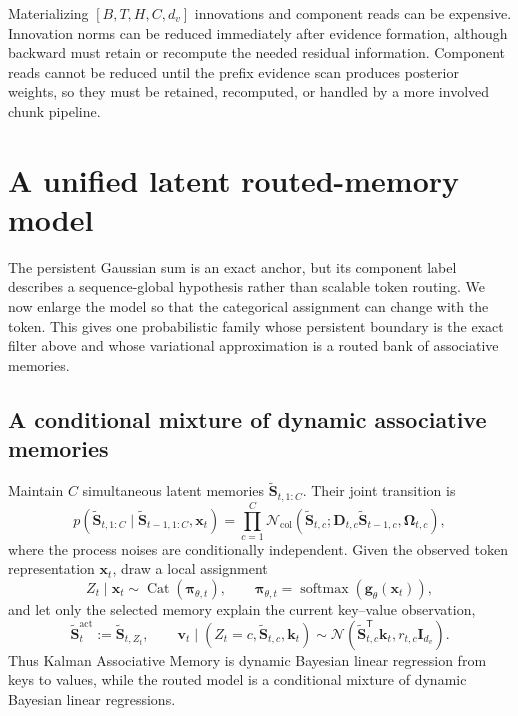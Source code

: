 \documentclass[11pt]{article}
\newcommand{\ve}[1]{\boldsymbol{#1}}
\newcommand{\tr}{\mathsf{T}}
\newcommand{\Normal}{\mathcal{N}}
\newcommand{\Cat}{\operatorname{Cat}}
\newcommand{\softmax}{\operatorname{softmax}}
\begin{document}
Materializing $[B,T,H,C,d_v]$ innovations and component reads can be expensive.  Innovation norms
can be reduced immediately after evidence formation, although backward must retain or recompute
the needed residual information.  Component reads cannot be reduced until the prefix evidence
scan produces posterior weights, so they must be retained, recomputed, or handled by a more
involved chunk pipeline.

\section{A unified latent routed-memory model}
\label{sec:kdn3-routing-boundary}

The persistent Gaussian sum is an exact anchor, but its component label describes a
sequence-global hypothesis rather than scalable token routing.  We now enlarge the model so that
the categorical assignment can change with the token.  This gives one probabilistic family whose
persistent boundary is the exact filter above and whose variational approximation is a routed bank
of associative memories.

\subsection{A conditional mixture of dynamic associative memories}
\label{sec:kdn3-routed-generative}

Maintain $C$ simultaneous latent memories
$\widetilde{\ve{S}}_{t,1:C}$.  Their joint transition is
\begin{equation}
  p(\widetilde{\ve{S}}_{t,1:C}
    \mid\widetilde{\ve{S}}_{t-1,1:C},\ve{x}_t)
  =\prod_{c=1}^{C}
   \Normal_{\mathrm{col}}\!\left(
     \widetilde{\ve{S}}_{t,c};
     \ve{D}_{t,c}\widetilde{\ve{S}}_{t-1,c},
     \ve{\Omega}_{t,c}
   \right),
  \label{eq:kdn3-joint-bank-transition}
\end{equation}
where the process noises are conditionally independent.  Given the observed token representation
$\ve{x}_t$, draw a local assignment
\begin{equation}
  Z_t\mid\ve{x}_t
  \sim\Cat(\ve{\pi}_{\theta,t}),
  \qquad
  \ve{\pi}_{\theta,t}
  =\softmax(\ve{g}_{\theta}(\ve{x}_t)),
  \label{eq:kdn3-token-route-prior}
\end{equation}
and let only the selected memory explain the current key--value observation,
\begin{equation}
  \widetilde{\ve{S}}_{t}^{\mathrm{act}}
  :=\widetilde{\ve{S}}_{t,Z_t},
  \qquad
  \ve{v}_t\mid
  (Z_t=c,\widetilde{\ve{S}}_{t,c},\ve{k}_t)
  \sim
  \Normal(
    \widetilde{\ve{S}}_{t,c}^{\tr}\ve{k}_t,
    r_{t,c}\ve{I}_{d_v}).
  \label{eq:kdn3-routed-observation}
\end{equation}
Thus Kalman Associative Memory is dynamic Bayesian linear regression from keys to values, while
the routed model is a conditional mixture of dynamic Bayesian linear regressions.
\end{document}
